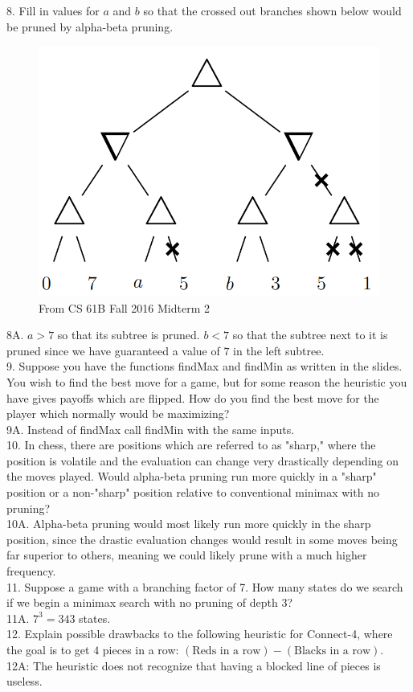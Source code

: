 \documentclass[12pt, letterpaper]{article}
\begin{document}
8. Fill in values for $a$ and $b$ so that the crossed out branches shown below would be pruned by alpha-beta pruning.
\begin{figure}[H]
    \centering
    \includegraphics[scale=0.3]{alpha-beta-prob.png}
    \caption*{From CS 61B Fall 2016 Midterm 2}
\end{figure}
8A. $a > 7$ so that its subtree is pruned. $b < 7$ so that the subtree next to it is pruned since we have guaranteed a value of $7$ in the left subtree. \\ 


9. Suppose you have the functions findMax and findMin as written in the slides. You wish to find the best move for a game, but for some reason the heuristic you have gives payoffs which are flipped. How do you find the best move for the player which normally would be maximizing? \\
9A. Instead of findMax call findMin with the same inputs. \\

10. In chess, there are positions which are referred to as "sharp," where the position is volatile and the evaluation can change very drastically depending on the moves played. Would alpha-beta pruning run more quickly in a "sharp" position or a non-"sharp" position relative to conventional minimax with no pruning? \\
10A. Alpha-beta pruning would most likely run more quickly in the sharp position, since the drastic evaluation changes would result in some moves being far superior to others, meaning we could likely prune with a much higher frequency. \\

11. Suppose a game with a branching factor of 7. How many states do we search if we begin a minimax search with no pruning of depth 3? \\
11A. $7^3 = 343$ states. \\

12. Explain possible drawbacks to the following heuristic for Connect-4, where the goal is to get $4$ pieces in a row: $(\text{Reds in a row}) - (\text{Blacks in a row})$. \\
12A: The heuristic does not recognize that having a blocked line of pieces is useless.
\end{document}

